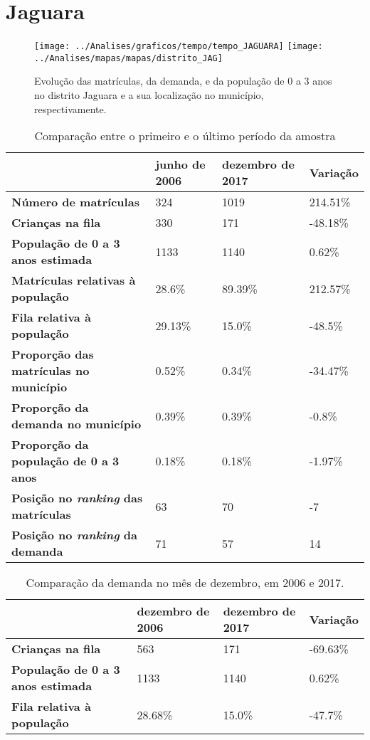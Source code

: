 \section{Jaguara}
\begin{figure}[H]
\centering
\texttt{[image: ../Analises/graficos/tempo/tempo\_JAGUARA]}
\texttt{[image: ../Analises/mapas/mapas/distrito\_JAG]}
\caption{Evolução das matrículas, da demanda, e da população de 0 a 3 anos no distrito Jaguara e a sua localização no município, respectivamente.}
\end{figure}
\begin{table}[H]
\begin{tabular}{l|l|l|l}
\textbf{}                                      & \textbf{junho de 2006}       & \textbf{dezembro de 2017}    & \textbf{Variação} \\ \hline
\textbf{Número de matrículas}                  & 324 & 1019 & 214.51\% \\ \hline
\textbf{Crianças na fila}                      & 330 & 171 & -48.18\% \\ \hline
\textbf{População de 0 a 3 anos estimada}      & 1133 & 1140 & 0.62\% \\ \hline
\textbf{Matrículas relativas à população}      & 28.6\% & 89.39\% & 212.57\% \\ \hline
\textbf{Fila relativa à população}             & 29.13\% & 15.0\% & -48.5\% \\ \hline
\textbf{Proporção das matrículas no município} & 0.52\% & 0.34\% & -34.47\% \\ \hline
\textbf{Proporção da demanda no município}     & 0.39\% & 0.39\% & -0.8\% \\ \hline
\textbf{Proporção da população de 0 a 3 anos}  & 0.18\% & 0.18\% & -1.97\% \\ \hline
\textbf{Posição no \textit{ranking} das matrículas}     & 63 & 70 & -7 \\ \hline
\textbf{Posição no \textit{ranking} da demanda}         & 71 & 57 & 14 \\ 
\end{tabular}
\caption{Comparação entre o primeiro e o último período da amostra}
\end{table}
\begin{table}[H]
\begin{tabular}{l|l|l|l}
\textbf{}                                 & \textbf{dezembro de 2006} & \textbf{dezembro de 2017} & \textbf{Variação} \\ \hline
\textbf{Crianças na fila}                      & 563 & 171 & -69.63\% \\ \hline
\textbf{População de 0 a 3 anos estimada}      & 1133 & 1140 & 0.62\% \\ \hline
\textbf{Fila relativa à população}             & 28.68\% & 15.0\% & -47.7\% \\
\end{tabular}
\caption{Comparação da demanda no mês de dezembro, em 2006 e 2017.}
\end{table}
